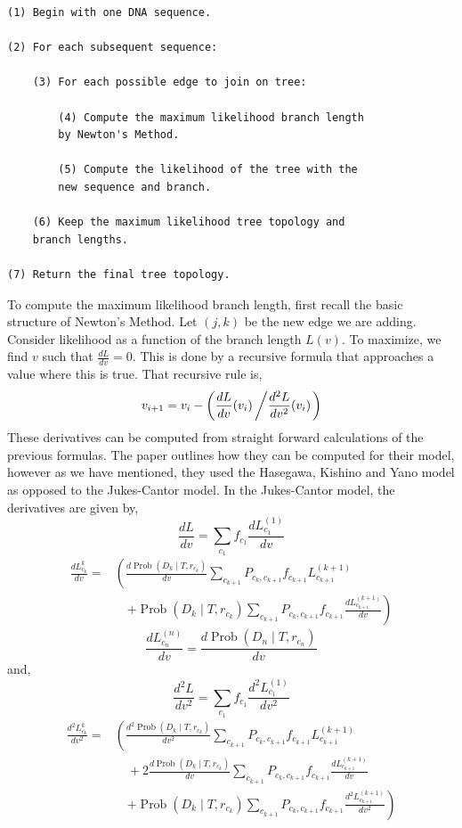 \documentclass[12pt]{article}
\newcommand{\prob}{\operatorname{Prob}}
\begin{document}
\begin{lstlisting}
(1) Begin with one DNA sequence.

(2) For each subsequent sequence:

    (3) For each possible edge to join on tree:

        (4) Compute the maximum likelihood branch length 
        by Newton's Method.

        (5) Compute the likelihood of the tree with the 
        new sequence and branch.

    (6) Keep the maximum likelihood tree topology and 
    branch lengths.

(7) Return the final tree topology. \end{lstlisting}
    To compute the maximum likelihood branch length, first recall the basic structure of Newton's Method.
    Let $(j,k)$ be the new edge we are adding.
    Consider likelihood as a function of the branch length $L(v)$.
    To maximize, we find $v$ such that $\frac{dL}{dv} = 0$.
    This is done by a recursive formula that approaches a value where this is true.
    That recursive rule is,
    \begin{gather*}
        v_{i+1} = v_i - \left( \frac{dL}{dv}(v_i) \left/ \frac{d^2L}{dv^2}(v_i) \right. \right)
    \end{gather*}
    These derivatives can be computed from straight forward calculations of the previous formulas.
    The paper outlines how they can be computed for their model, however as we have mentioned, they used the Hasegawa, Kishino and Yano model as opposed to the Jukes-Cantor model.
    In the Jukes-Cantor model, the derivatives are given by,
    \[
        \frac{dL}{dv} = \sum_{c_1}f_{c_1}\frac{dL_{c_1}^{(1)}}{dv}
    \]
    \begin{align*}
        \frac{dL_{c_k}^{k}}{dv} 
        =& \left( \frac{d\prob(D_k \mid T, r_{c_k})}{dv}
            \sum_{c_{k+1}}P_{c_k, c_{k+1}}f_{c_{k+1}}L_{c_{k+1}}^{(k+1)} \right. \\
        &\quad \left. + \prob(D_k \mid T, r_{c_k})
            \sum_{c_{k+1}}P_{c_k, c_{k+1}}f_{c_{k+1}} \frac{dL_{c_{k+1}}^{(k+1)}}{dv} \right)
    \end{align*}
    \[
        \frac{dL_{c_n}^{(n)}}{dv} = \frac{d\prob(D_n \mid T, r_{c_n})}{dv}
    \]
    and,
    \[
        \frac{d^2L}{dv^2} = \sum_{c_1}f_{c_1}\frac{d^2L_{c_1}^{(1)}}{dv^2}
    \]
    \begin{align*}
        \frac{d^2L_{c_k}^{k}}{dv^2} 
        =& \left(\frac{d^2\prob(D_k \mid T, r_{c_k})}{dv^2}
            \sum_{c_{k+1}}P_{c_k, c_{k+1}}f_{c_{k+1}}L_{c_{k+1}}^{(k+1)}\right. \\
        &\quad+2\frac{d\prob(D_k \mid T, r_{c_k})}{dv}
            \sum_{c_{k+1}}P_{c_k, c_{k+1}}f_{c_{k+1}}\frac{dL_{c_{k+1}}^{(k+1)}}{dv} \\
        &\quad\left.+\prob(D_k \mid T, r_{c_k})
            \sum_{c_{k+1}}P_{c_k, c_{k+1}}f_{c_{k+1}} \frac{d^2L_{c_{k+1}}^{(k+1)}}{dv^2}\right)
    \end{align*}
\end{document}
